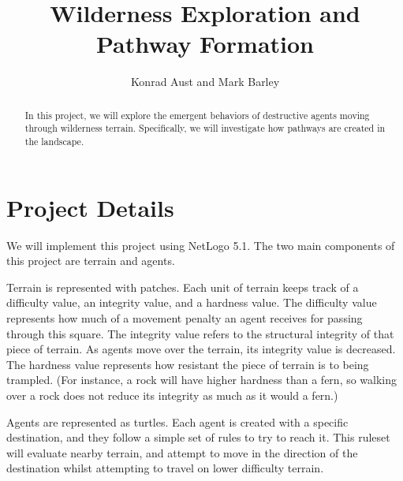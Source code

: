 \documentclass[10pt,runningheads]{llncs}
\begin{document}
\title{Wilderness Exploration and Pathway Formation}

\author{Konrad Aust and Mark Barley}


\maketitle


\begin{abstract} 
In this project, we will explore the emergent behaviors of destructive agents moving through wilderness terrain. Specifically, we will investigate how pathways are created in the landscape.
\end{abstract}

\section{Project Details}
We will implement this project using NetLogo 5.1. The two main components of this project are terrain and agents. 

Terrain is represented with patches. Each unit of terrain keeps track of a difficulty value, an integrity value, and a hardness value. The difficulty value represents how much of a movement penalty an agent receives for passing through this square. The integrity value refers to the structural integrity of that piece of terrain. As agents move over the terrain, its integrity value is decreased. The hardness value represents how resistant the piece of terrain is to being trampled. (For instance, a rock will have higher hardness than a fern, so walking over a rock does not reduce its integrity as much as it would a fern.)

Agents are represented as turtles. Each agent is created with a specific destination, and they follow a simple set of rules to try to reach it. This ruleset will evaluate nearby terrain, and attempt to move in the direction of the destination whilst attempting to travel on lower difficulty terrain. 
\end{document}
